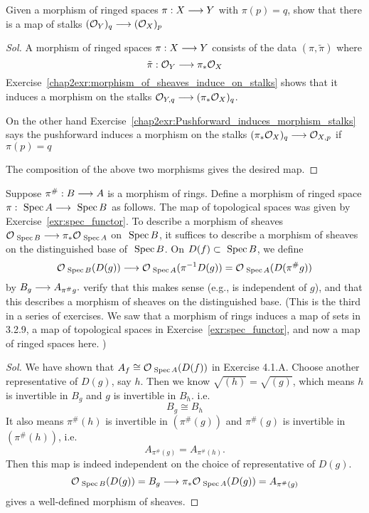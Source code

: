 \documentclass[11pt]{book} %
\begin{document}
\begin{exr}
Given a morphism of ringed spaces $\pi:X\longrightarrow Y$ with  $\pi(p)=q$, show that there is a map of stalks $({\cal O}_Y)_q\longrightarrow ({\cal O}_X)_p$
\end{exr}
\begin{proof}[Sol]
A morphism of ringed spaces $\pi:X\longrightarrow Y$ consists of the data $(\pi,\tilde{\pi})$ where
$$
\tilde{\pi}:{\cal O}_Y\longrightarrow \pi_*{\cal O}_X
$$
Exercise~\ref{chap2exr:morphism_of_sheaves_induce_on_stalks} shows that it induces a morphism on the stalks ${\cal O}_{Y,q}\longrightarrow(\pi_*{\cal O}_X)_{q}$.

On the other hand Exercise~\ref{chap2exr:Pushforward_induces_morphism_stalks} says the pushforward induces a morphism on the stalks $(\pi_{*}{\cal O}_X)_{q}\longrightarrow{\cal O}_{X,p}$ if $\pi(p)=q$

The composition of the above two morphisms gives the desired map.
\end{proof}
\begin{exr}\label{chap6exr:ring_morphism_induces_morphisms_ringed_spaces}
Suppose $\pi^\#:B\longrightarrow A$ is a morphism of rings. Define a morphism of ringed space $\pi:\text{ Spec\,} A\longrightarrow \text{ Spec\,} B$ as follows. The map of topological spaces was given by Exercise~\ref{exr:spec_functor}. To describe a morphism of sheaves ${\cal O}_{\text{ Spec\,} B}\longrightarrow \pi_*{\cal O}_{\text{ Spec\,} A}$ on $\text{ Spec\,} B$, it suffices to describe a morphism of sheaves on the distinguished base of $\text{ Spec\,} B$. On $D(f)\subset \text{ Spec\,} B$, we define
$$
{\cal O}_{\text{ Spec\,} B}(D(g))\longrightarrow {\cal O}_{\text{ Spec\,} A}(\pi^{-1}D(g))={\cal O}_{\text{ Spec\,} A}(D(\pi^\#g))
$$
by $B_g\longrightarrow A_{\pi^\# g}.$ verify that this makes sense (e.g., is independent of $g$), and that this describes a morphism of sheaves on the distinguished base. (This is the third in a series of exercises. We saw that a morphism of rings induces a map of sets in 3.2.9, a map of topological spaces in Exercise~\ref{exr:spec_functor}, and now a map of ringed spaces here. )
\end{exr}
\begin{proof}[Sol]
We have shown that $A_f\cong {\cal O}_{\text{ Spec\,} A}(D(f))$ in Exercise 4.1.A.
Choose another representative of $D(g)$, say $h$. Then we  know $\sqrt{(h)}=\sqrt{(g)}$, which means $h$ is invertible in $B_g$ and $g$ is invertible in $B_h$. i.e. 
$$
B_g\cong B_h
$$
It also means $\pi^\#(h)$ is invertible in $(\pi^\#(g))$ and $\pi^\#(g)$ is invertible in $(\pi^\#(h))$, i.e.
$$
A_{\pi^\#(g)}=A_{\pi^\#(h)}.
$$
Then this map is indeed independent on the choice of representative of $D(g)$.
$$
{\cal O}_{\text{ Spec\,} B}(D(g))=B_g\longrightarrow \pi_*{\cal O}_{\text{ Spec\,} A}(D(g))=A_{\pi^\#(g)}
$$
gives a well-defined morphism of sheaves.
\end{proof}
\end{document}
